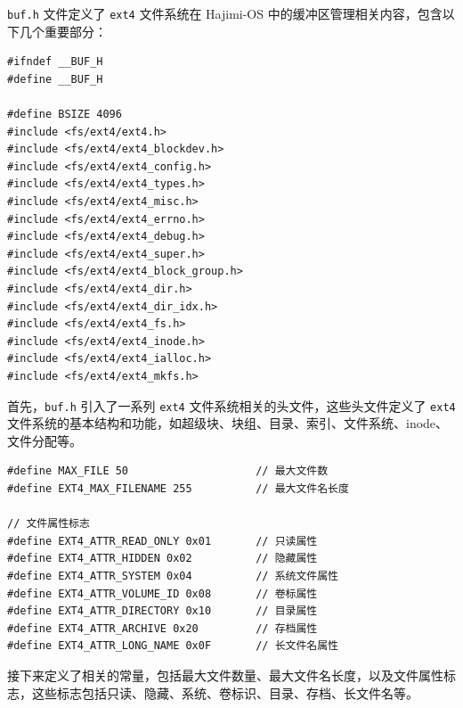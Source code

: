 \documentclass[UTF8]{article}
\begin{document}
\texttt{buf.h} 文件定义了 \texttt{ext4} 文件系统在 Hajimi-OS 中的缓冲区管理相关内容，包含以下几个重要部分：

\begin{lstlisting}[style=c-style]
#ifndef __BUF_H
#define __BUF_H

#define BSIZE 4096
#include <fs/ext4/ext4.h>
#include <fs/ext4/ext4_blockdev.h>
#include <fs/ext4/ext4_config.h>
#include <fs/ext4/ext4_types.h>
#include <fs/ext4/ext4_misc.h>
#include <fs/ext4/ext4_errno.h>
#include <fs/ext4/ext4_debug.h>
#include <fs/ext4/ext4_super.h>
#include <fs/ext4/ext4_block_group.h>
#include <fs/ext4/ext4_dir.h>
#include <fs/ext4/ext4_dir_idx.h>
#include <fs/ext4/ext4_fs.h>
#include <fs/ext4/ext4_inode.h>
#include <fs/ext4/ext4_ialloc.h>
#include <fs/ext4/ext4_mkfs.h>
\end{lstlisting}

首先，\texttt{buf.h} 引入了一系列 \texttt{ext4} 文件系统相关的头文件，这些头文件定义了 \texttt{ext4} 文件系统的基本结构和功能，如超级块、块组、目录、索引、文件系统、inode、文件分配等。

\begin{lstlisting}[style=c-style]
#define MAX_FILE 50                    // 最大文件数
#define EXT4_MAX_FILENAME 255          // 最大文件名长度

// 文件属性标志
#define EXT4_ATTR_READ_ONLY 0x01       // 只读属性
#define EXT4_ATTR_HIDDEN 0x02          // 隐藏属性
#define EXT4_ATTR_SYSTEM 0x04          // 系统文件属性
#define EXT4_ATTR_VOLUME_ID 0x08       // 卷标属性
#define EXT4_ATTR_DIRECTORY 0x10       // 目录属性
#define EXT4_ATTR_ARCHIVE 0x20         // 存档属性
#define EXT4_ATTR_LONG_NAME 0x0F       // 长文件名属性
\end{lstlisting}

接下来定义了相关的常量，包括最大文件数量、最大文件名长度，以及文件属性标志，这些标志包括只读、隐藏、系统、卷标识、目录、存档、长文件名等。
\end{document}
